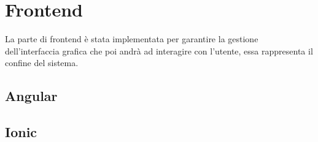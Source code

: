 \documentclass{article}
\begin{document}
\section{Frontend}
La parte di frontend è stata implementata per garantire la gestione dell'interfaccia grafica che poi andrà ad interagire con l'utente, essa rappresenta il confine del sistema.

\subsection{Angular}
\subsection{Ionic}


\nocite{*}
\printbibliography[heading = bibintoc]
\end{document}
